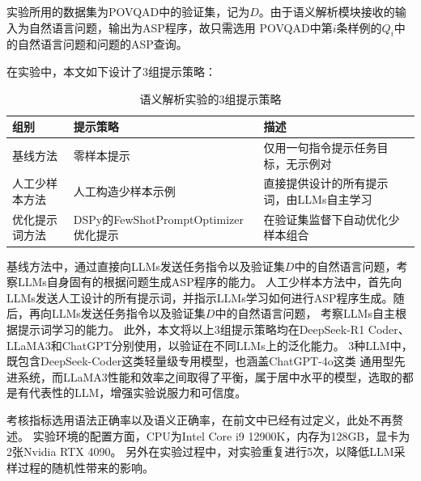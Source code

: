 实验所用的数据集为POVQAD中的验证集，记为$D$。由于语义解析模块接收的输入为自然语言问题，输出为ASP程序，故只需选用
POVQAD中第$i$条样例的$Q_i$中的自然语言问题和问题的ASP查询。

在实验中，本文如下设计了3组提示策略：
\begin{table}[H]
\centering
\caption{语义解析实验的3组提示策略}
\begin{tabular}{|l|p{5.5cm}|p{5.5cm}|}
\hline
\textbf{组别} & \textbf{提示策略} & \textbf{描述} \\
\hline
基线方法 & 零样本提示 & 仅用一句指令提示任务目标，无示例对 \\
\hline
人工少样本方法 & 人工构造少样本示例 & 直接提供设计的所有提示词，由LLMs自主学习 \\
\hline
优化提示词方法 & DSPy的FewShotPromptOptimizer优化提示 & 在验证集监督下自动优化少样本组合 \\
\hline
\end{tabular}
\end{table}
基线方法中，通过直接向LLMs发送任务指令以及验证集$D$中的自然语言问题，考察LLMs自身固有的根据问题生成ASP程序的能力。
人工少样本方法中，首先向LLMs发送人工设计的所有提示词，并指示LLMs学习如何进行ASP程序生成。随后，再向LLMs发送任务指令以及验证集$D$中的自然语言问题，
考察LLMs自主根据提示词学习的能力。
此外，本文将以上3组提示策略均在DeepSeek-R1 Coder、LLaMA3和ChatGPT分别使用，以验证在不同LLMs上的泛化能力。
3种LLM中，既包含DeepSeek-Coder这类轻量级专用模型，也涵盖ChatGPT-4o这类
通用型先进系统，而LLaMA3性能和效率之间取得了平衡，属于居中水平的模型，选取的都是有代表性的LLM，增强实验说服力和可信度。

考核指标选用语法正确率以及语义正确率，在前文中已经有过定义，此处不再赘述。
实验环境的配置方面，CPU为Intel Core i9 12900K，内存为128GB，显卡为2张Nvidia RTX 4090。
另外在实验过程中，对实验重复进行5次，以降低LLM采样过程的随机性带来的影响。

